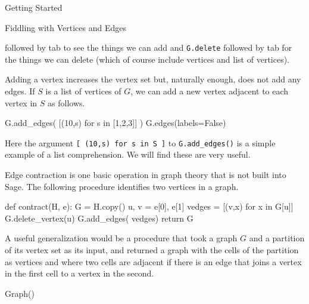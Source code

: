 \begin{chap}{Getting Started}
\begin{sect}{Fiddling with Vertices and Edges}
\begin{para}
followed by tab to see the things we can add and \verb|G.delete|
followed by tab for the things we can delete (which of course include
vertices and list of vertices).
\end{para}
%
\begin{para}
Adding a vertex increases the vertex set but, naturally enough, does
not add any edges.
If $S$ is a list of vertices of $G$, we can add a new vertex adjacent to 
each vertex in $S$ as follows.
\end{para}
%
\begin{sagecode}
\begin{sageinput}
G.add_edges( [(10,s) for s in [1,2,3]] )
G.edges(labels=False)
\end{sageinput}
\begin{sageoutput}
[(0, 2), (0, 8), (1, 2), (1, 3), 
(1, 8), (1, 10), (2, 3), (2, 10), 
(3, 4), (3, 5), (3, 10), (4, 5), 
(4, 6), (5, 6), (5, 7), (6, 7), 
(6, 8), (7, 8)]
\end{sageoutput}
\end{sagecode}
%
\begin{para}
Here the argument \verb|[ (10,s) for s in S ]| to \verb|G.add_edges()| 
is a simple example of a list comprehension.  
We will find these are very useful.
\end{para}
%
\begin{para}
Edge contraction is one basic operation in graph theory that is not built 
into Sage.  The following procedure identifies two vertices in a graph.
\end{para}
%
\begin{sagecode}
\begin{sageinput}
def contract(H, e):
    G = H.copy() 
    u, v = e[0], e[1]
    vedges = [(v,x) for x in G[u]]  
    G.delete_vertex(u)
    G.add_edges( vedges)
    return G
\end{sageinput}
\begin{sageoutput}
\end{sageoutput}
\end{sagecode}
%
\begin{para}
A useful generalization would be a procedure that took a graph $G$
and a partition of its vertex set as its input, and returned
a graph with the cells of the partition as vertices and where
two cells are adjacent if there is an edge that joins a vertex
in the first cell to a vertex in the second.
\end{para}
%
\end{sect}
%
\begin{sect}{Graph()}

\end{sect}
\end{chap}
